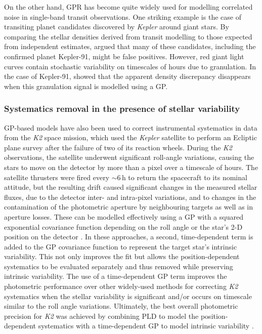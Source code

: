 \documentclass[letterpaper]{ar-1col}
\begin{document}
On the other hand, GPR has become quite widely used for modelling correlated noise in single-band transit observations. One striking example is the case of transiting planet candidates discovered by \textit{Kepler} around giant stars. By comparing the stellar densities derived from transit modelling to those expected from independent estimates, \citet{2014ApJ...788..148S} argued that many of these candidates, including the confirmed planet Kepler-91, might be false positives. However, red giant light curves contain stochastic variability on timescales of hours due to granulation. In the case of Kepler-91, \citet{2015ApJ...800...46B} showed that the apparent density discrepancy disappears when this granulation signal is modelled using a GP.

\subsubsection{Systematics removal in the presence of stellar variability}
GP-based models have also been used to correct instrumental systematics in data from the \textit{K2} space mission, which used the \textit{Kepler} satellite to perform an Ecliptic plane survey after the failure of two of its reaction wheels. During the \textit{K2} observations, the satellite underwent significant roll-angle variations, causing the stars to move on the detector by more than a pixel over a timescale of hours. The satellite thrusters were fired every $\sim 6$\,h to return the spacecraft to its nominal attitude, but the resulting drift caused significant changes in the measured stellar fluxes, due to the detector inter- and intra-pixel variations, and to changes in the contamination of the photometric aperture by neighbouring targets as well as in aperture losses. These can be modelled effectively using a GP with a squared exponential covariance function depending on the roll angle \citep{2015MNRAS.447.2880A, 2016ApJS..226....7C} or the star's 2-D position on the detector \citet{2016MNRAS.459.2408A}. In these approaches, a second, time-dependent term is added to the GP covariance function to represent the target star's intrinsic variability. This not only improves the fit but allows the position-dependent systematics to be evaluated separately and thus removed while preserving intrinsic variability. The use of a time-dependent GP term improves the photometric performance over other widely-used methods for correcting \textit{K2} systematics \citep[e.g.,][]{2014PASP..126..948V} when the stellar variability is significant and/or occurs on timescale similar to the roll angle variations. Ultimately, the best overall photometric precision for \textit{K2} was achieved by combining PLD to model the position-dependent systematics with a time-dependent GP to model intrinsic variability \citep{everest1,everest2}.
\end{document}
